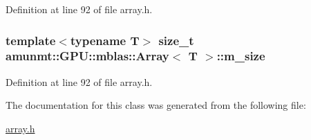 Definition at line 92 of file array.\+h.

\subsubsection[{\texorpdfstring{m\+\_\+size}{m_size}}]{\setlength{\rightskip}{0pt plus 5cm}template$<$typename T$>$ size\+\_\+t {\bf amunmt\+::\+G\+P\+U\+::mblas\+::\+Array}$<$ T $>$\+::m\+\_\+size\hspace{0.3cm}{\ttfamily [protected]}}\hypertarget{classamunmt_1_1GPU_1_1mblas_1_1Array_aa90aef4140b4b8b7a280a12cfb5d18be}{}\label{classamunmt_1_1GPU_1_1mblas_1_1Array_aa90aef4140b4b8b7a280a12cfb5d18be}


Definition at line 92 of file array.\+h.



The documentation for this class was generated from the following file\+:\begin{DoxyCompactItemize}
\item 
\hyperlink{array_8h}{array.\+h}\end{DoxyCompactItemize}
